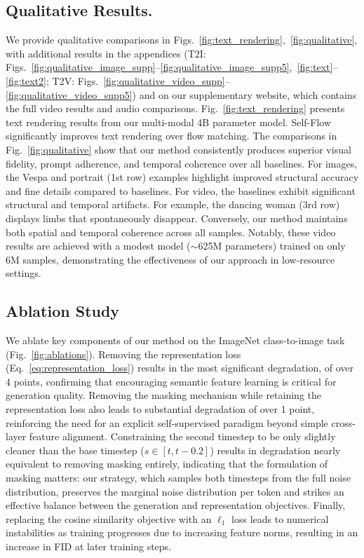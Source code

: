 \subsection{Qualitative Results.}
We provide qualitative comparisons in Figs.~\ref{fig:text_rendering},~\ref{fig:qualitative}, with additional results in the appendices (T2I: Figs.~\ref{fig:qualitative_image_supp}--\ref{fig:qualitative_image_supp5},~\ref{fig:text}--\ref{fig:text2}; T2V: Figs.~\ref{fig:qualitative_video_supp}--\ref{fig:qualitative_video_supp5}) and on our supplementary website, which contains the full video results and audio comparisons. Fig.~\ref{fig:text_rendering} presents text rendering results from our multi-modal 4B parameter model. Self-Flow significantly improves text rendering over flow matching. The comparisons in Fig.~\ref{fig:qualitative} show that our method consistently produces superior visual fidelity, prompt adherence, and temporal coherence over all baselines. For images, the Vespa and portrait (1st row) examples highlight improved structural accuracy and fine details compared to baselines. For video, the baselines exhibit significant structural and temporal artifacts. For example, the dancing woman (3rd row) displays limbs that spontaneously disappear. Conversely, our method maintains both spatial and temporal coherence across all samples. Notably, these video results are achieved with a modest model ($\sim$625M parameters) trained on only 6M samples, demonstrating the effectiveness of our approach in low-resource settings.

\subsection{Ablation Study} 
We ablate key components of our method on the ImageNet class-to-image task (Fig.~\ref{fig:ablations}). Removing the representation loss (Eq.~\ref{eq:representation_loss}) results in the most significant degradation, of over 4 points, confirming that encouraging semantic feature learning is critical for generation quality. Removing the masking mechanism while retaining the representation loss also leads to substantial degradation of over 1 point, reinforcing the need for an explicit self-supervised paradigm beyond simple cross-layer feature alignment. Constraining the second timestep to be only slightly cleaner than the base timestep ($s \in [t, t - 0.2]$) results in degradation nearly equivalent to removing masking entirely, indicating that the formulation of masking matters: our strategy, which samples both timesteps from the full noise distribution, preserves the marginal noise distribution per token and strikes an effective balance between the generation and representation objectives. Finally, replacing the cosine similarity objective with an $\ell_1$ loss leads to numerical instabilities as training progresses due to increasing feature norms, resulting in an increase in FID at later training steps. 